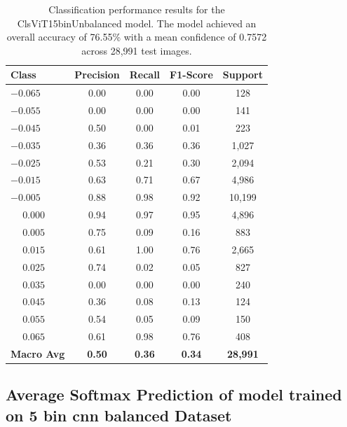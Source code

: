 \begin{table}[htbp]
\centering
\begin{tabular}{@{}lcccc@{}}
\toprule
\textbf{Class} & \textbf{Precision} & \textbf{Recall} & \textbf{F1-Score} & \textbf{Support} \\
\midrule
$-0.065$ & 0.00 & 0.00 & 0.00 & 128 \\
$-0.055$ & 0.00 & 0.00 & 0.00 & 141 \\
$-0.045$ & 0.50 & 0.00 & 0.01 & 223 \\
$-0.035$ & 0.36 & 0.36 & 0.36 & 1,027 \\
$-0.025$ & 0.53 & 0.21 & 0.30 & 2,094 \\
$-0.015$ & 0.63 & 0.71 & 0.67 & 4,986 \\
$-0.005$ & 0.88 & 0.98 & 0.92 & 10,199 \\
$\phantom{-}0.000$ & 0.94 & 0.97 & 0.95 & 4,896 \\
$\phantom{-}0.005$ & 0.75 & 0.09 & 0.16 & 883 \\
$\phantom{-}0.015$ & 0.61 & 1.00 & 0.76 & 2,665 \\
$\phantom{-}0.025$ & 0.74 & 0.02 & 0.05 & 827 \\
$\phantom{-}0.035$ & 0.00 & 0.00 & 0.00 & 240 \\
$\phantom{-}0.045$ & 0.36 & 0.08 & 0.13 & 124 \\
$\phantom{-}0.055$ & 0.54 & 0.05 & 0.09 & 150 \\
$\phantom{-}0.065$ & 0.61 & 0.98 & 0.76 & 408 \\
\midrule
\textbf{Macro Avg} & \textbf{0.50} & \textbf{0.36} & \textbf{0.34} & \textbf{28,991} \\
\bottomrule
\end{tabular}
\caption{Classification performance results for the ClsViT15binUnbalanced model. The model achieved an overall accuracy of 76.55\% with a mean confidence of 0.7572 across 28,991 test images.}
\label{tab:clf_report_ClsViT15binUnbalanced}
\end{table}



\subsection{Average Softmax Prediction of model trained on 5 bin cnn balanced Dataset}

